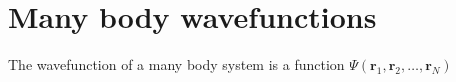 \section{Many body wavefunctions}

The wavefunction of a many body system is a function $\Psi(\textbf{r}_1,\textbf{r}_2,\ldots,\textbf{r}_N)$